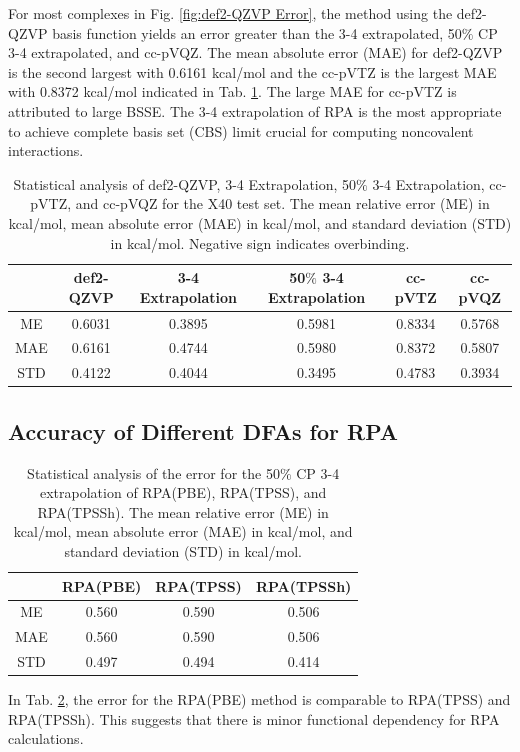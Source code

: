 \documentclass[11pt]{article}
\begin{document}
For most complexes in Fig. \ref{fig:def2-QZVP Error}, the method using
the def2-QZVP basis function yields an error greater than the 3-4 extrapolated,
50$\%$ CP 3-4 extrapolated, and cc-pVQZ. The mean absolute error (MAE) for
def2-QZVP is the second largest with 0.6161 kcal/mol and the cc-pVTZ is the
largest MAE with 0.8372 kcal/mol indicated in Tab. \ref{tab:table_1}. The
large MAE for cc-pVTZ is attributed to large BSSE. The 3-4 extrapolation
of RPA is the most appropriate to achieve complete basis set (CBS) limit
crucial for computing noncovalent interactions.

\begin{table}[hbpt]
  \caption{Statistical analysis of def2-QZVP, 3-4 Extrapolation, 50$\%$ 3-4
    Extrapolation, cc-pVTZ, and cc-pVQZ for the X40 test set. The mean
    relative error (ME) in kcal/mol, mean absolute error (MAE) in kcal/mol,
    and standard deviation (STD) in kcal/mol. Negative sign indicates overbinding.}
  \centering
  \begin{tabular}{c|c|c|c|c|c}
    & def2-QZVP & 3-4 Extrapolation & 50$\%$ 3-4 Extrapolation & cc-pVTZ  &
    cc-pVQZ \\
    \hline\hline
    ME & 0.6031 & 0.3895 & 0.5981 & 0.8334 & 0.5768 \\
    MAE & 0.6161 & 0.4744 & 0.5980 & 0.8372 & 0.5807 \\
    STD & 0.4122 & 0.4044 & 0.3495 & 0.4783 & 0.3934 \\
  \end{tabular}
  \label{tab:table_1}
\end{table}

\subsection{Accuracy of Different DFAs for RPA}

\begin{table}[hbpt]
  \centering
  \caption{Statistical analysis of the error for the 50$\%$ CP 3-4
    extrapolation of RPA(PBE), RPA(TPSS), and RPA(TPSSh). The mean relative
    error (ME) in kcal/mol, mean absolute error (MAE) in kcal/mol, and
    standard deviation (STD) in kcal/mol.}
  \begin{tabular}{c|c|c|c}
    & RPA(PBE) & RPA(TPSS) & RPA(TPSSh) \\
    \hline\hline
    ME & 0.560 & 0.590  & 0.506 \\
    MAE & 0.560 & 0.590 & 0.506 \\
    STD & 0.497 & 0.494 & 0.414 \\
  \end{tabular}
  \label{tab:errors_RPA(DFA)}
\end{table}
In Tab. \ref{tab:errors_RPA(DFA)}, the error for the RPA(PBE) method is
comparable to RPA(TPSS) and RPA(TPSSh). This suggests that there is
minor functional dependency for RPA calculations.
\end{document}
